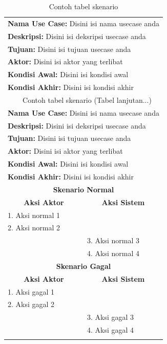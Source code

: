 
{
\fontsize{10}{12}\selectfont
\begin{longtable}{p{6.5cm} p{6.5cm}}

	\caption{Contoh tabel skenario}\\
	\hline
	\multicolumn{2}{p{13cm}}{\textbf{Nama Use Case:} Disini isi nama usecase anda}\\
	\multicolumn{2}{p{13cm}}{\textbf{Deskripsi:} Disini isi deksripsi usecase anda}\\
	\multicolumn{2}{p{13cm}}{\textbf{Tujuan:} Disini isi tujuan usecase anda}\\
	\multicolumn{2}{p{13cm}}{\textbf{Aktor:} Disini isi aktor yang terlibat}\\
	\multicolumn{2}{p{13cm}}{\textbf{Kondisi Awal:} Disini isi kondisi awal}\\
	\multicolumn{2}{p{13cm}}{\textbf{Kondisi Akhir:} Disini isi kondisi akhir}\\
	\hline
	\endfirsthead

	\multicolumn{2}{c}{\tablename\ \thetable\ Contoh tabel skenario \space (Tabel lanjutan...)} \\
	\hline
	\multicolumn{2}{p{13cm}}{\textbf{Nama Use Case:} Disini isi nama usecase anda}\\
	\multicolumn{2}{p{13cm}}{\textbf{Deskripsi:} Disini isi deksripsi usecase anda}\\
	\multicolumn{2}{p{13cm}}{\textbf{Tujuan:} Disini isi tujuan usecase anda}\\
	\multicolumn{2}{p{13cm}}{\textbf{Aktor:} Disini isi aktor yang terlibat}\\
	\multicolumn{2}{p{13cm}}{\textbf{Kondisi Awal:} Disini isi kondisi awal}\\
	\multicolumn{2}{p{13cm}}{\textbf{Kondisi Akhir:} Disini isi kondisi akhir}\\
	\hline
	\endhead


	\multicolumn{2}{c}{\textbf{Skenario Normal}}\\ \hline
	\multicolumn{1}{c}{\textbf{Aksi Aktor}} & \multicolumn{1}{c}{\textbf{Aksi Sistem}}\\
	1. Aksi normal 1 & \\
	2. Aksi normal 2 &\\
	& 3. Aksi normal 3\\
	& 4. Aksi normal 4\\

	\hline
	\multicolumn{2}{c}{\textbf{Skenario Gagal}}\\ \hline
	\multicolumn{1}{c}{\textbf{Aksi Aktor}} & \multicolumn{1}{c}{\textbf{Aksi Sistem}}\\
	1. Aksi gagal 1 & \\
	2. Aksi gagal 2 &\\
	& 3. Aksi gagal 3\\
	& 4. Aksi gagal 4\\ \hline

\label{tabelD}
\end{longtable}
}

